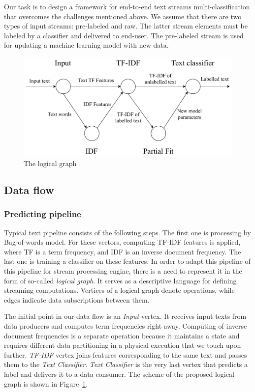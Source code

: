 \label{fs-framework}

Our task is to design a framework for end-to-end text streams multi-classification that overcomes the challenges mentioned above. We assume that there are two types of input streams: pre-labeled and raw. The latter stream elements must be labeled by a classifier and delivered to end-user. The pre-labeled stream is used for updating a machine learning model with new data.

\begin{figure}[htbp]
  \centering
  \includegraphics[scale=0.48]{pics/logical-graph}
  \caption{The logical graph}
  \label {logical_graph}
\end{figure}

\subsection{Data flow \label{DF}}

\subsubsection{Predicting pipeline}

Typical text pipeline consists of the following steps. The first one is processing by Bag-of-words model. For these vectors, computing TF-IDF features is applied, where TF is a term frequency, and IDF is an inverse document frequency. The last one is training a classifier on these features. In order to adapt this pipeline of this pipeline for stream processing engine, there is a need to represent it in the form of so-called {\em logical graph}. It serves as a descriptive language for defining streaming computations. Vertices of a logical graph denote operations, while edges indicate data subscriptions between them. 

The initial point in our data flow is an {\em Input} vertex. It receives input texts from data producers and computes term frequencies right away. Computing of inverse document frequencies is a separate operation because it maintains a state and requires different data partitioning in a physical execution that we touch upon further. {\em TF-IDF} vertex joins features corresponding to the same text and passes them to the {\em Text Classifier}. {\em Text Classifier} is the very last vertex that predicts a label and delivers it to a data consumer. The scheme of the proposed logical graph is shown in Figure~\ref{logical_graph}.

